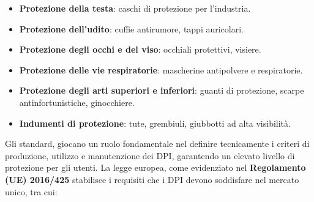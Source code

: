 \begin{itemize}
    \item \textbf{Protezione della testa}: caschi di protezione per l'industria.
    
    \item \textbf{Protezione dell'udito}: cuffie antirumore, tappi auricolari.
    
    \item \textbf{Protezione degli occhi e del viso}: occhiali protettivi, visiere.
    
    \item \textbf{Protezione delle vie respiratorie}: mascherine antipolvere e respiratorie.
    
    \item \textbf{Protezione degli arti superiori e inferiori}: guanti di protezione, scarpe antinfortunistiche, ginocchiere.
    
    \item \textbf{Indumenti di protezione}: tute, grembiuli, giubbotti ad alta visibilità.
\end{itemize}

\noindent Gli standard, giocano un ruolo fondamentale nel definire tecnicamente i criteri di produzione, utilizzo e manutenzione dei DPI, garantendo un elevato livello di protezione per gli utenti. La legge europea, come evidenziato nel \textbf{Regolamento (UE) 2016/425} stabilisce i requisiti che i DPI devono soddisfare nel mercato unico\cite{b4regolamento425}, tra cui:

